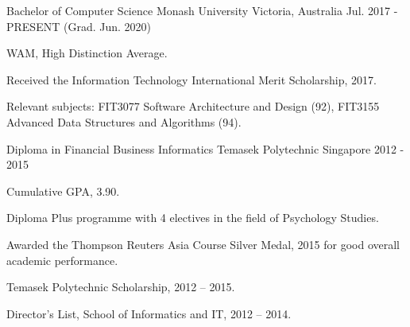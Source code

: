 \begin{cventries}
  \cventry
    {Bachelor of Computer Science}
    {Monash University}
    {Victoria, Australia}
    {Jul. 2017 - PRESENT (Grad. Jun. 2020)}
    {
      \begin{cvitems}
        \item {WAM, High Distinction Average.}
        \item {Received the Information Technology International Merit Scholarship, 2017.}
		\item {Relevant subjects: FIT3077 Software Architecture and Design (92), FIT3155 Advanced Data Structures and Algorithms (94).}
      \end{cvitems}
    }
    
    \cventry
    {Diploma in Financial Business Informatics}
    {Temasek Polytechnic}
    {Singapore}
    {2012 - 2015}
    {
      \begin{cvitems}
        \item {Cumulative GPA, 3.90.}
        \item {Diploma Plus programme with 4 electives in the field of Psychology Studies.}
        \item {Awarded the Thompson Reuters Asia Course Silver Medal, 2015 for good overall academic performance.}
        \item {Temasek Polytechnic Scholarship, 2012 – 2015.}
        \item {Director’s List, School of Informatics and IT, 2012 – 2014.}
      \end{cvitems}
    }
\end{cventries}
  
